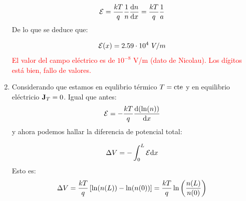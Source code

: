 \begin{texercise}
\begin{enumerate}[label=\alph*)]
		\begin{equation}
			\mathcal{E} = \frac{kT}{q} \frac{1}{n} \frac{\mathrm{d} n}{\mathrm{d} x} = \frac{kT}{q} \frac{1}{a}
		\end{equation}
		De lo que se deduce que:

		\begin{equation}
			\Ecal(x) = 2.59 \cdot 10^{4} \ V/m
		\end{equation}
		\textcolor{red}{El valor del campo eléctrico es de $10^{-8}$ V/m (dato de Nicolau). Los dígitos está bien, fallo de valores.}
		\item Considerando que estamos en equlibrio térmico $T=\text{cte}$ y en equilibrio eléctricio $\mathbf{J}_T=0$. Igual que antes:
		\begin{equation}
			\mathcal{E} = - \frac{kT}{q} \frac{\mathrm{d} (\ln(n))}{\mathrm{d} x}
		\end{equation}
		y ahora podemos hallar la diferencia de potencial total:

		\begin{equation}
			\Delta V = - \int_{0}^L \mathcal{E} \mathrm{d} x
		\end{equation}
		Esto es:
		\begin{equation}
			\Delta V = \frac{kT}{q} \left[ \ln(n(L))-\ln(n(0)) \right] = \frac{kT}{q} \ln\left( \frac{n(L)}{n(0)} \right) 
		\end{equation}
	\end{enumerate}
\end{texercise}



